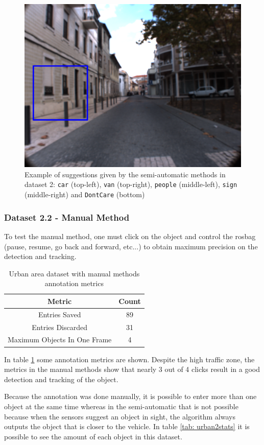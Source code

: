 \begin{figure}[htp]
	\includegraphics[width=.49\textwidth]{capresults/imgs/dontcare2.png}
	
	\caption{Example of suggestions given by the semi-automatic methods in dataset 2:  \texttt{car} (top-left), \texttt{van} (top-right), \texttt{people} (middle-left), \texttt{sign} (middle-right) and  \texttt{DontCare} (bottom)}
	\label{fig:dataset2results1}
	
\end{figure}


\subsubsection{Dataset 2.2 - Manual Method}

To test the manual method, one must click on the object and control the rosbag (pause, resume, go back and forward, etc...) to obtain maximum precision on the detection and tracking. 

\begin{table}[htp]
	\centering
	\caption{Urban area dataset with manual methods annotation metrics}
	\label{tab: urban2metrics}
	\begin{tabular}{c|c}
		\textbf{Metric}              & \textbf{Count} \\ \hline
		Entries Saved           & 89                      \\ \hline
		Entries Discarded            & 31                      \\ \hline
		Maximum Objects In One Frame & 4                 
	\end{tabular}
\end{table}

In table \ref{tab: urban2metrics} some annotation metrics are shown. Despite the high traffic zone, the metrics in the manual methods show that nearly 3 out of 4 clicks result in a good detection and tracking of the object. 

Because the annotation was done manually, it is possible to enter more than one object at the same time whereas in the semi-automatic that is not possible because when the sensors suggest an object in sight, the algorithm always outputs the object that is closer to the vehicle. In table \ref{tab: urban2stats} it is possible to see the amount of each object in this dataset.

